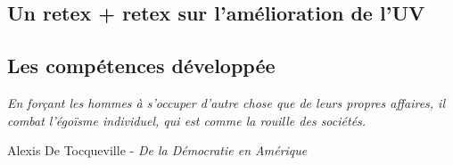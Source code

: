 
\subsection{Un retex + retex sur l’amélioration de l’UV}

\subsection{Les compétences développée}



\begin{center}
    \textit{\og En forçant les hommes à s'occuper d'autre chose que de leurs propres affaires, il combat l'égoïsme individuel, qui est comme la rouille des sociétés. \fg{}}

    Alexis De Tocqueville - \textit{De la Démocratie en Amérique}\cite{De_la_Democratie_en_Amerique}
\end{center}

